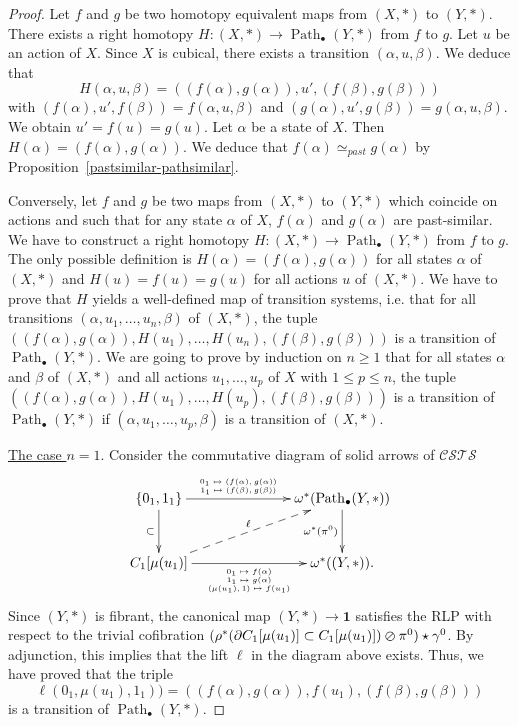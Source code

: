 \documentclass[a4paper,12pt]{amsart}
\begin{document}
\begin{proof} Let $f$ and $g$ be two homotopy equivalent maps from $(X,*)$ to
$(Y,*)$.  There exists a right homotopy $H:(X,*) \to
\operatorname{{Path}}_\bullet(Y,*)$ from $f$ to $g$.  Let $u$ be an action of
$X$. Since $X$ is cubical, there exists a transition
$(\alpha,u,\beta)$. We deduce that
\[H(\alpha,u,\beta) = ((f(\alpha),g(\alpha)),u',(f(\beta),g(\beta)))\]
with $(f(\alpha),u',f(\beta))=f(\alpha,u,\beta)$ and
$(g(\alpha),u',g(\beta))=g(\alpha,u,\beta)$. We obtain $u'=f(u)=g(u)$.
Let $\alpha$ be a state of $X$. Then $H(\alpha) =
(f(\alpha),g(\alpha))$. We deduce that $f(\alpha)\simeq_{past}
g(\alpha)$ by Proposition~\ref{pastsimilar-pathsimilar}.

Conversely, let $f$ and $g$ be two maps from $(X,*)$ to $(Y,*)$ which
coincide on actions and such that for any state $\alpha$ of $X$,
$f(\alpha)$ and $g(\alpha)$ are past-similar.  We have to construct a
right homotopy $H:(X,*) \to \operatorname{{Path}}_\bullet(Y,*)$ from $f$ to $g$. The
only possible definition is $H(\alpha)=(f(\alpha),g(\alpha))$ for all
states $\alpha$ of $(X,*)$ and $H(u)=f(u)=g(u)$ for all actions $u$ of
$(X,*)$. We have to prove that $H$ yields a well-defined map of
transition systems, i.e. that for all transitions
$(\alpha,u_1,\dots,u_n,\beta)$ of $(X,*)$, the tuple
$((f(\alpha),g(\alpha)),H(u_1),\dots,H(u_n),(f(\beta),g(\beta)))$ is a
transition of $\operatorname{{Path}}_\bullet(Y,*)$. We are going to prove by
induction on $n{\geqslant} 1$ that for all states $\alpha$ and $\beta$ of
$(X,*)$ and all actions $u_1,\dots,u_p$ of $X$ with $1{\leqslant} p {\leqslant} n$,
the tuple
$((f(\alpha),g(\alpha)),H(u_1),\dots,H(u_p),(f(\beta),g(\beta)))$ is a
transition of $\operatorname{{Path}}_\bullet(Y,*)$ if $(\alpha,u_1,\dots,u_p,\beta)$
is a transition of $(X,*)$.

\underline{The case $n=1$}. Consider the commutative diagram of solid
arrows of ${\mathcal{C\!S\!T\!S}}$
\[
\xymatrix@C=7em@R=3em
{
\{0_1,1_1\} {\ar@{->}[d]_-{{\subset}}} {\ar@{->}[r]^-{{\text{\tiny {\(\begin{array}{c}0_1 \mapsto (f(\alpha),g(\alpha)) \\1_1 \mapsto (f(\beta),g(\beta))\end{array}\)}}}}} & \omega^*(\operatorname{{Path}}_\bullet(Y,*)) {\ar@{->}[d]_-{{\omega^*(\pi^0)}}} \\ 
C_1[\mu(u_1)] \ar@{-->}[ru]^-{\ell}\ar@{->}[r]_-{\text{\tiny {\(\begin{array}{c}0_1 \mapsto f(\alpha) \\1_1 \mapsto g(\alpha)\\(\mu(u_1),1) \mapsto f(u_1)\end{array}\)}}} & \omega^*((Y,*)).
}
\]
Since $(Y,*)$ is fibrant, the canonical map $(Y,*)\to \mathbf{1}$ satisfies the
RLP with respect to the trivial cofibration $(\rho^*({\partial} C_1[\mu(u_1)]
\subset C_1[\mu(u_1)])\varoslash \pi^0) \star \gamma^0$. By adjunction, this implies
that the lift $\ell$ in the diagram above exists. Thus, we have proved
that the triple
\[\ell(0_1,\mu(u_1),1_1))=((f(\alpha),g(\alpha)),f(u_1),(f(\beta),g(\beta)))\]
is a transition of $\operatorname{{Path}}_\bullet(Y,*)$.


\end{proof}
\end{document}
